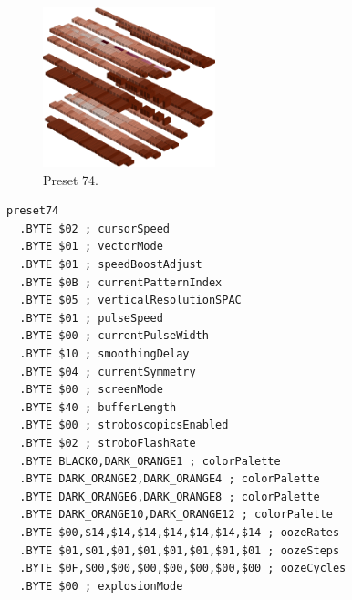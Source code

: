 \vspace*{-0.5cm}
\begin{minipage}[b]{0.48\linewidth}
\begin{figure}[H]                                                          
  \centering                                                             
  \begin{adjustbox}{width=5cm,center}                                   
  \includegraphics[width=5cm]{src/colorspace_presets/preset74-45.png}%
  \end{adjustbox}                                                        
\caption*{Preset 74.}                                           
\end{figure}                                                               
\end{minipage}
\hspace{0.1cm}
\begin{minipage}[b]{0.48\linewidth}                                                                         
\begin{lstlisting}[basicstyle=\ttfamily\tiny]
preset74
  .BYTE $02 ; cursorSpeed
  .BYTE $01 ; vectorMode
  .BYTE $01 ; speedBoostAdjust
  .BYTE $0B ; currentPatternIndex
  .BYTE $05 ; verticalResolutionSPAC
  .BYTE $01 ; pulseSpeed
  .BYTE $00 ; currentPulseWidth
  .BYTE $10 ; smoothingDelay
  .BYTE $04 ; currentSymmetry
  .BYTE $00 ; screenMode
  .BYTE $40 ; bufferLength
  .BYTE $00 ; stroboscopicsEnabled
  .BYTE $02 ; stroboFlashRate
  .BYTE BLACK0,DARK_ORANGE1 ; colorPalette
  .BYTE DARK_ORANGE2,DARK_ORANGE4 ; colorPalette
  .BYTE DARK_ORANGE6,DARK_ORANGE8 ; colorPalette
  .BYTE DARK_ORANGE10,DARK_ORANGE12 ; colorPalette
  .BYTE $00,$14,$14,$14,$14,$14,$14,$14 ; oozeRates
  .BYTE $01,$01,$01,$01,$01,$01,$01,$01 ; oozeSteps
  .BYTE $0F,$00,$00,$00,$00,$00,$00,$00 ; oozeCycles
  .BYTE $00 ; explosionMode
\end{lstlisting}
\end{minipage}


